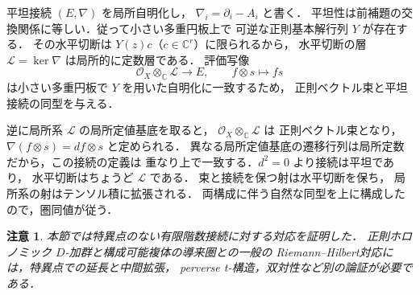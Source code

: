 \documentclass[a5paper,10pt,onecolumn]{jsarticle}
\makeatletter
\theoremstyle{mathnotetheorem}
\newtheorem{remark}[theorem]{注意}
\renewcommand{\proofname}{証明}
\renewenvironment{proof}[1][\proofname]{%
  \par\pushQED{\qed}\normalfont\topsep4\p@\@plus2\p@\relax
  \trivlist\item[\hskip\labelsep\bfseries #1]\ignorespaces
}{\popQED\endtrivlist\@endpefalse}
\makeatother
\begin{document}
\begin{proof}
平坦接続 $(E,\nabla)$ を局所自明化し，
$\nabla_i=\partial_i-A_i$ と書く．
平坦性は前補題の交換関係に等しい．従って小さい多重円板上で
可逆な正則基本解行列 $Y$ が存在する．
その水平切断は $Y(z)c$（$c\in\mathbb C^r$）に限られるから，
水平切断の層 $\mathcal L=\ker\nabla$ は局所的に定数層である．
評価写像
\[
 \mathcal O_X\otimes_{\mathbb C}\mathcal L
 \longrightarrow E,\qquad f\otimes s\longmapsto fs
\]
は小さい多重円板で $Y$ を用いた自明化に一致するため，
正則ベクトル束と平坦接続の同型を与える．

逆に局所系 $\mathcal L$ の局所定値基底を取ると，
$\mathcal O_X\otimes_{\mathbb C}\mathcal L$ は
正則ベクトル束となり，$\nabla(f\otimes s)=df\otimes s$ と定められる．
異なる局所定値基底の遷移行列は局所定数だから，この接続の定義は
重なり上で一致する．$d^2=0$ より接続は平坦であり，
水平切断はちょうど $\mathcal L$ である．
束と接続を保つ射は水平切断を保ち，
局所系の射はテンソル積に拡張される．
両構成に伴う自然な同型を上に構成したので，圏同値が従う．
\end{proof}
\begin{remark}
本節では特異点のない有限階数接続に対する対応を証明した．
正則ホロノミック $D$-加群と構成可能複体の導来圏との一般の
Riemann--Hilbert対応には，特異点での延長と中間拡張，
perverse t-構造，双対性など別の論証が必要である．
\end{remark}
\end{document}
